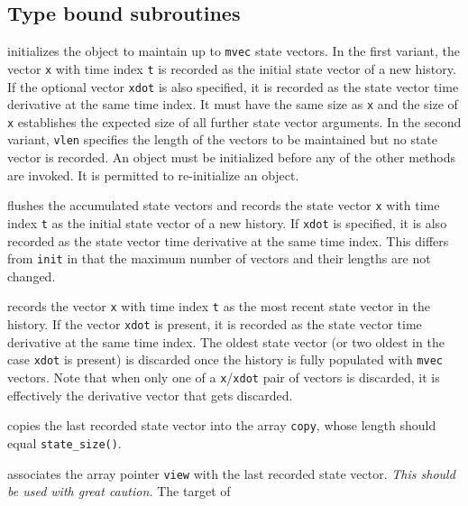 \documentclass[11pt]{article}
\begin{document}
\subsection{Type bound subroutines}
\begin{description}[style=nextline]\setlength{\itemsep}{0pt}
\item[\texttt{init(mvec, \LBr t, x \Lbr,xdot\Rbr | vlen\RBr)}]
  initializes the object to maintain up to \texttt{mvec} state vectors.
  In the first variant, the vector \texttt{x} with time index \texttt{t}
  is recorded as the initial state vector of a new history.  If the optional
  vector \texttt{xdot} is also specified, it is recorded as the state
  vector time derivative at the same time index.  It must have the same
  size as \texttt{x} and the size of \texttt{x} establishes the expected
  size of all further state vector arguments.  In the second variant,
  \texttt{vlen} specifies the length of the vectors to be maintained but
  no state vector is recorded.  An object must be initialized before any
  of the other methods are invoked.  It is permitted to re-initialize an
  object.
\item[\texttt{flush(t, x \Lbr,xdot\Rbr)}]
  flushes the accumulated state vectors and records the state vector
  \texttt{x} with time index \texttt{t} as the initial state vector of
  a new history.  If \texttt{xdot} is specified, it is also recorded as
  the state vector time derivative at the same time index.  This differs
  from \texttt{init} in that the maximum number of vectors and their
  lengths are not changed.
\item[\texttt{record_state(t, x \Lbr,xdot\Rbr)}]
  records the vector \texttt{x} with time index \texttt{t} as the most recent
  state vector in the history.  If the vector \texttt{xdot} is present, it is
  recorded as the state vector time derivative at the same time index.  The
  oldest state vector (or two oldest in the case \texttt{xdot} is present) is
  discarded once the history is fully populated with \texttt{mvec} vectors.
  Note that when only one of a \texttt{x}/\texttt{xdot} pair of vectors is
  discarded, it is effectively the derivative vector that gets discarded.
\item[\texttt{get_last_state_copy(copy)}]
  copies the last recorded state vector into the array \texttt{copy},
  whose length should equal \texttt{state_size()}.
\item[\texttt{get_last_state_view(view)}]
  associates the array pointer \texttt{view} with the last recorded state
  vector.  \emph{This should be used with great caution.}  The target of

\end{description}
\end{document}

